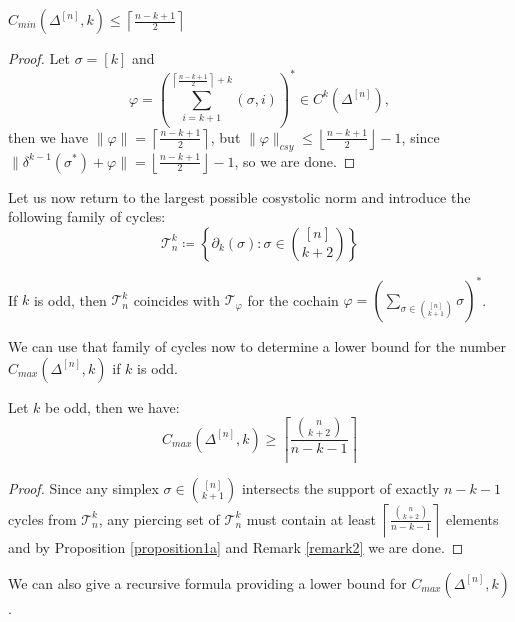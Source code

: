 \begin{prop}\label{proposition231}
\(C_{min}(\Delta^{[n]},k)\leq\left\lceil\frac{n-k+1}{2}\right\rceil\)
\begin{proof}
Let \(\sigma=[k]\) and
\[
\varphi=\left(\sum\limits_{i=k+1}^{\left\lceil\frac{n-k+1}{2}\right\rceil+k}(\sigma,i)\right)^*\in C^k(\Delta^{[n]}),
\]
then we have \(\|\varphi\|=\left\lceil\frac{n-k+1}{2}\right\rceil\), but \(\|\varphi\|_{csy}\leq\left\lfloor\frac{n-k+1}{2}\right\rfloor-1\), since\\
\(\|\delta^{k-1}(\sigma^*)+\varphi\|=\left\lfloor\frac{n-k+1}{2}\right\rfloor-1\), so we are done.
\end{proof}
\end{prop}

Let us now return to the largest possible cosystolic norm and introduce the following family of cycles:
\[
\mathcal{T}_n^k\coloneqq \left\{\partial_k(\sigma):\sigma\in\binom{[n]}{k+2}\right\}
\]

\begin{rem}\label{remark2}
If \(k\) is odd, then \(\mathcal{T}_n^k\) coincides with \(\mathcal{T}_{\varphi}\) for the cochain \(\varphi=\left(\sum\limits_{\sigma\in\binom{[n]}{k+1}}\sigma\right)^*\).
\end{rem}

We can use that family of cycles now to determine a lower bound for the number \(C_{max}(\Delta^{[n]},k)\) if \(k\) is odd.

\begin{prop}\label{proposition11}
Let \(k\) be odd, then we have:
\[
C_{max}(\Delta^{[n]},k)\geq \left\lceil\frac{\binom{n}{k+2}}{n-k-1}\right\rceil
\]
\begin{proof}
Since any simplex \(\sigma\in\binom{[n]}{k+1}\) intersects the support of exactly \(n-k-1\) cycles from \(\mathcal{T}_n^k\), any piercing set of \(\mathcal{T}_n^k\) must contain at least \(\left\lceil\frac{\binom{n}{k+2}}{n-k-1}\right\rceil\) elements and by Proposition \ref{proposition1a} and Remark \ref{remark2} we are done.
\end{proof}
\end{prop}

We can also give a recursive formula providing a lower bound for \(C_{max}(\Delta^{[n]},k)\).

